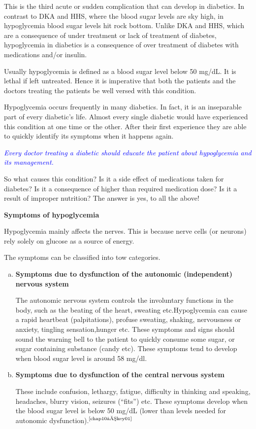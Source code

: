 This is the third acute or sudden complication that can develop in diabetics. In contrast to DKA and HHS, where the blood sugar levels are sky high, in hypoglycemia blood sugar levels hit rock bottom. Unlike DKA and HHS, which are a consequence of under treatment or lack of treatment of diabetes, hypoglycemia in diabetics is a consequence of over treatment of diabetes with medications and/or insulin.

Usually hypoglycemia is defined as a blood sugar level below 50 mg/dL. It is lethal if left untreated. Hence it is imperative that both the patients and the doctors treating the patients be well versed with this condition.

Hypoglycemia occurs frequently in many diabetics. In fact, it is an inseparable part of every diabetic’s life. Almost every single diabetic would have experienced this condition at one time or the other. After their first experience they are able to quickly identify its symptoms when it happens again.

\textcolor{blue}{\textit{Every doctor treating a diabetic should educate the patient about hypoglycemia and its management.}}

So what causes this condition? Is it a side effect of medications taken for diabetes? Is it a consequence of higher than required medication dose? Is it a result of improper nutrition? The answer is yes, to all the above!

\noindent\textbf{Symptoms of hypoglycemia}

Hypoglycemia mainly affects the nerves. This is because nerve cells (or neurons) rely solely on glucose as a source of energy.

\noindent The symptoms can be classified into tow categories.

\begin{enumerate}[a)]
\itemsep=0pt
\item \textbf{Symptoms due to dysfunction of the autonomic (independent) nervous system}

The autonomic nervous system controls the involuntary functions in the body, such as the beating of the heart, sweating etc.\break Hypoglycemia can cause a rapid heartbeat (palpitations), profuse sweating, shaking, nervousness or anxiety, tingling sensation,\break hunger etc. These symptoms and signs should sound the warning bell to the patient to quickly consume some sugar, or sugar contai\-ning substance (candy etc). These symptoms tend to develop when blood sugar level is around 58 mg/dl.
 \item \textbf{Symptoms due to dysfunction of the central nervous system}

These include confusion, lethargy, fatigue, difficulty in thinking and speaking, headaches, blurry vision, seizures (“fits”) etc. These symptoms develop when the blood sugar level is below 50 mg/dL (lower than levels needed for autonomic dysfunction).$^{\text{\cite{chap10–key01}}}$
\end{enumerate}

